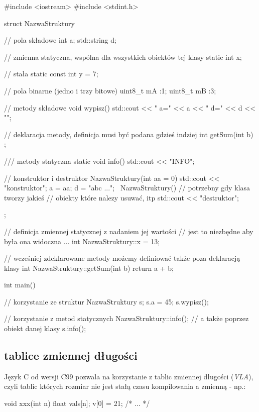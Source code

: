 \begin{CodeFrame*}[cpp]{}
#include <iostream>
#include <stdint.h>

struct NazwaStruktury {
    // pola składowe
    int a;
    std::string d;
    
    // zmienna statyczna, wspólna dla wszystkich obiektów tej klasy
    static int x;
    
    // stała
    static const int y = 7;
    
    // pola binarne (jedno i trzy bitowe)
    uint8_t mA :1;
    uint8_t mB :3;
    
    // metody składowe
    void wypisz() {
        std::cout << " a=" << a << " d=" << d << "\n";
    }
    
    // deklaracja metody, definicja musi być podana gdzieś indziej
    int getSum(int b) ;
    
    /// metody statyczna
    static void info() {
        std::cout << "INFO\n";
    }
    
    // konstruktor i destruktor
    NazwaStruktury(int aa = 0) {
        std::cout << "konstruktor\n";
        a = aa;
        d = "abc ...";
    }
    ~NazwaStruktury() {
        // potrzebny gdy klasa tworzy jakieś
        // obiekty które nalezy usuwać, itp
        std::cout << "destruktor\n";
    }
};

// definicja zmiennej statycznej z nadaniem jej wartości
// jest to niezbędne aby była ona widoczna ...
int NazwaStruktury::x = 13;

// wcześniej zdeklarowane metody możemy definiować także poza deklaracją klasy
int NazwaStruktury::getSum(int b) {
    return a + b;
}

int main() {
    // korzystanie ze struktur
    NazwaStruktury s;
    s.a = 45;
    s.wypisz();

    // korzystanie z metod statycznych
    NazwaStruktury::info();
    // a także poprzez obiekt danej klasy
    s.info();
}
\end{CodeFrame*}

\subsection{tablice zmiennej długości}

Język C od wersji C99 pozwala na korzystanie z tablic zmiennej długości (\textit{VLA}),
czyli tablic których rozmiar nie jest stałą czasu kompilowania a zmienną - np.:

\begin{CodeFrame*}[c]{}
void xxx(int n) {
    float vals[n];
    v[0] = 21;
    /* ... */
}
\end{CodeFrame*}

